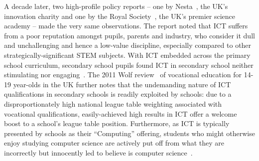 \documentclass{llncs}
\begin{document}
A decade later, two high-profile policy reports -- one by
Nesta~\cite{nextgen-report}, the UK's innovation charity and one by
the Royal Society~\cite{RoyalSoc:2012}, the UK's premier science
academy -- made the very same observations.  The report noted that ICT
suffers from a poor reputation amongst pupils, parents and industry,
who consider it dull and unchallenging and hence a low-value
discipline, especially compared to other strategically-significant
STEM subjects. With ICT embedded across the primary school curriculum,
secondary school pupils found ICT in secondary school neither
stimulating nor engaging~\cite{sentance-et-al-wipsce2012}. The 2011
Wolf review~\cite{Wolf:2011} of vocational education for 14-19
year-olds in the UK further notes that the undemanding nature of ICT
qualifications in secondary schools is readily exploited by schools:
due to a disproportionately high national league table weighting
associated with vocational qualifications, easily-achieved high
results in ICT offer a welcome boost to a school's league table
position. Furthermore, as ICT is typically presented by schools as
their ``Computing'' offering, students who might otherwise enjoy
studying computer science are actively put off from what they are
incorrectly but innocently led to believe is computer
science~\cite{crick+sentance:2011,brown-et-al-sigcse2012}.

\end{document}
